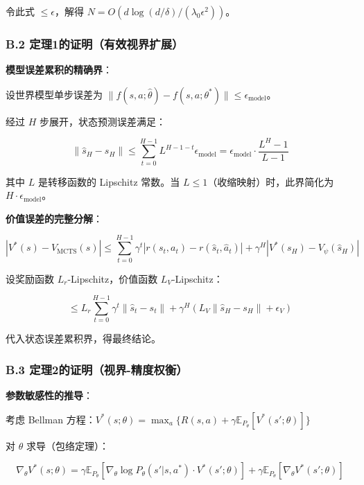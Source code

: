 \documentclass[UTF8]{ctexart}
\begin{document}
令此式 \(\leq \epsilon\)，解得
\(N = O(d\log(d/\delta)/(\lambda_0\epsilon^2))\)。

\hypertarget{b.2-ux5b9aux74061ux7684ux8bc1ux660eux6709ux6548ux89c6ux754cux6269ux5c55}{%
\subsubsection{B.2
定理1的证明（有效视界扩展）}\label{b.2-ux5b9aux74061ux7684ux8bc1ux660eux6709ux6548ux89c6ux754cux6269ux5c55}}

\textbf{模型误差累积的精确界}：

设世界模型单步误差为
\(\|f(s,a;\hat{\theta}) - f(s,a;\theta^*)\| \leq \epsilon_{\text{model}}\)。

经过 \(H\) 步展开，状态预测误差满足：

\[
\|\hat{s}_H - s_H\| \leq \sum_{t=0}^{H-1} L^{H-1-t} \epsilon_{\text{model}} = \epsilon_{\text{model}} \cdot \frac{L^H - 1}{L - 1}
\]

其中 \(L\) 是转移函数的 Lipschitz 常数。当
\(L \leq 1\)（收缩映射）时，此界简化为
\(H \cdot \epsilon_{\text{model}}\)。

\textbf{价值误差的完整分解}：

\[
|V^*(s) - \hat{V}_{\text{MCTS}}(s)| \leq \sum_{t=0}^{H-1} \gamma^t |r(s_t,a_t) - r(\hat{s}_t,\hat{a}_t)| + \gamma^H |V^*(s_H) - V_\psi(\hat{s}_H)|
\]

设奖励函数 \(L_r\)-Lipschitz，价值函数 \(L_V\)-Lipschitz：

\[
\leq L_r \sum_{t=0}^{H-1} \gamma^t \|\hat{s}_t - s_t\| + \gamma^H (L_V \|\hat{s}_H - s_H\| + \epsilon_V)
\]

代入状态误差累积界，得最终结论。

\hypertarget{b.3-ux5b9aux74062ux7684ux8bc1ux660eux89c6ux754c-ux7cbeux5ea6ux6743ux8861}{%
\subsubsection{B.3
定理2的证明（视界-精度权衡）}\label{b.3-ux5b9aux74062ux7684ux8bc1ux660eux89c6ux754c-ux7cbeux5ea6ux6743ux8861}}

\textbf{参数敏感性的推导}：

考虑 Bellman
方程：\(V^*(s;\theta) = \max_a \{R(s,a) + \gamma \mathbb{E}_{P_\theta}[V^*(s';\theta)]\}\)

对 \(\theta\) 求导（包络定理）：

\[
\nabla_\theta V^*(s;\theta) = \gamma \mathbb{E}_{P_\theta}[\nabla_\theta \log P_\theta(s'|s,a^*) \cdot V^*(s';\theta)] + \gamma \mathbb{E}_{P_\theta}[\nabla_\theta V^*(s';\theta)]
\]
\end{document}
